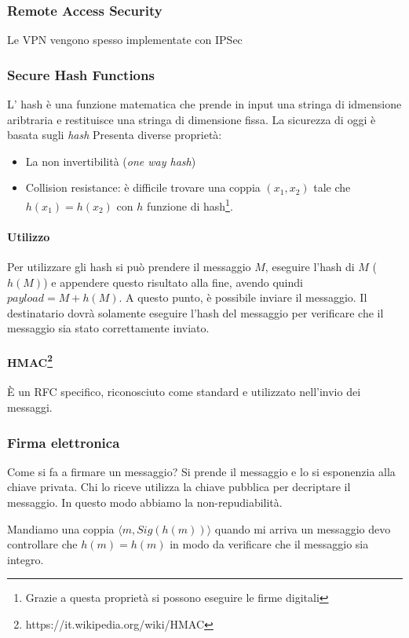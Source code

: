 \subsubsection{Remote Access Security}

Le VPN vengono spesso implementate con IPSec 

\subsubsection{Secure Hash Functions}

L' hash è una funzione matematica che prende in input una stringa di idmensione 
aribtraria e restituisce una stringa di dimensione fissa. La sicurezza di oggi è 
basata sugli \textit{hash} Presenta diverse proprietà:
\begin{itemize}
\item La non invertibilità (\emph{one way hash})
\item Collision resistance: è difficile trovare una coppia $(x_1,x_2)$ tale che 
$h(x_1) = h(x_2)$ con $h$ funzione di hash\footnote{Grazie a questa proprietà si 
possono eseguire le firme digitali}.
\end{itemize}

\paragraph*{Utilizzo}

Per utilizzare gli hash si può prendere il messaggio $M$, eseguire l'hash di $M$ 
($h(M)$) e appendere questo risultato alla fine, avendo quindi $payload = M + 
h(M)$. A questo punto, è possibile inviare il messaggio. Il destinatario dovrà 
solamente eseguire l'hash del messaggio per verificare che il messaggio sia 
stato correttamente inviato.

\paragraph*{HMAC\footnote{https://it.wikipedia.org/wiki/HMAC}}

È un RFC specifico, riconosciuto come standard e utilizzato nell'invio dei 
messaggi.


\subsubsection{Firma elettronica}

Come si fa a firmare un messaggio? Si prende il messaggio e lo si esponenzia 
alla chiave privata. Chi lo riceve utilizza la chiave pubblica per decriptare il 
messaggio. In questo modo abbiamo la non-repudiabilità.

Mandiamo una coppia $ \langle m, Sig(h(m)) \rangle $ quando mi arriva un 
messaggio devo controllare che
$h(m) = h(m)$ in modo da verificare che il messaggio sia integro.

